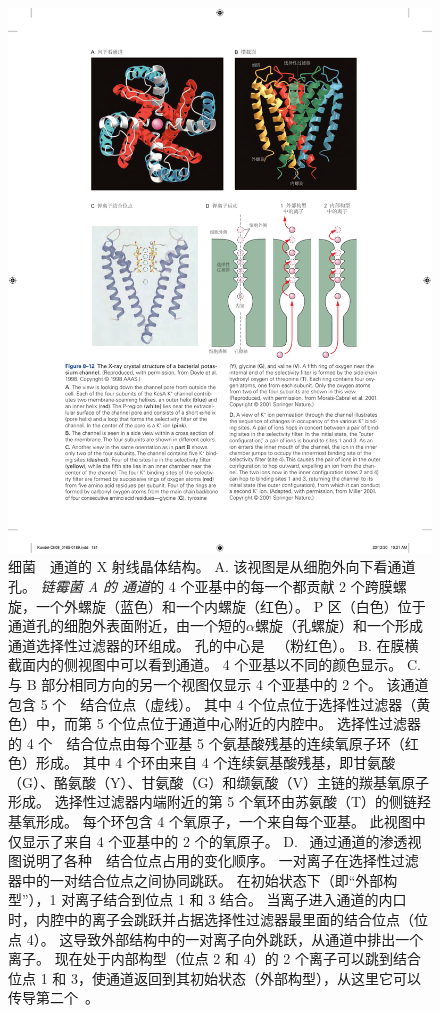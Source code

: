 \begin{figure}[htbp]
	\centering
	\includegraphics[width=0.9\linewidth]{chap08/fig_8_12}
	\caption{细菌~~通道的 X 射线晶体结构\cite{doyle1998structure}。
		A. 该视图是从细胞外向下看通道孔。
		\textit{链霉菌 A 的  通道}的 4 个亚基中的每一个都贡献 2 个跨膜螺旋，一个外螺旋（蓝色）和一个内螺旋（红色）。
		P 区（白色）位于通道孔的细胞外表面附近，由一个短的$\alpha$螺旋（孔螺旋）和一个形成通道选择性过滤器的环组成。
		孔的中心是~ （粉红色）。
		B. 在膜横截面内的侧视图中可以看到通道。
		4 个亚基以不同的颜色显示。
		C. 与 B 部分相同方向的另一个视图仅显示 4 个亚基中的 2 个。
		该通道包含 5 个~~结合位点（虚线）。
		其中 4 个位点位于选择性过滤器（黄色）中，而第 5 个位点位于通道中心附近的内腔中。
		选择性过滤器的 4 个~~结合位点由每个亚基 5 个氨基酸残基的连续氧原子环（红色）形成。
		其中 4 个环由来自 4 个连续氨基酸残基，即甘氨酸（G）、酪氨酸（Y）、甘氨酸（G）和缬氨酸（V）主链的羰基氧原子形成。
		选择性过滤器内端附近的第 5 个氧环由苏氨酸（T）的侧链羟基氧形成。
		每个环包含 4 个氧原子，一个来自每个亚基。
		此视图中仅显示了来自 4 个亚基中的 2 个的氧原子\cite{morais2001energetic}。
		D. ~通过通道的渗透视图说明了各种~~结合位点占用的变化顺序。
		一对离子在选择性过滤器中的一对结合位点之间协同跳跃。
		在初始状态下（即“外部构型”），1 对离子结合到位点 1 和 3 结合。
		当离子进入通道的内口时，内腔中的离子会跳跃并占据选择性过滤器最里面的结合位点（位点 4）。
		这导致外部结构中的一对离子向外跳跃，从通道中排出一个离子。
		现在处于内部构型（位点 2 和 4）的 2 个离子可以跳到结合位点 1 和 3，使通道返回到其初始状态（外部构型），从这里它可以传导第二个~\cite{miller2001see}。}
	\label{fig:8_12}
\end{figure}


